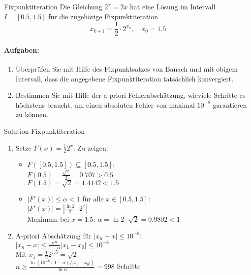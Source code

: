 \begin{example2}{Fixpunktiteration}
Die Gleichung $2^x = 2x$ hat eine Lösung im Intervall $I = [0.5, 1.5]$ für die zugehörige Fixpunktiteration
$$x_{k+1} = \frac{1}{2} \cdot 2^{x_k}, \quad x_0 = 1.5$$

\paragraph{Aufgaben:}
\begin{enumerate}
    \item Überprüfen Sie mit Hilfe des Fixpunktsatzes von Banach und mit obigem Intervall, dass die angegebene Fixpunktiteration tatsächlich konvergiert.
    
    \item Bestimmen Sie mit Hilfe der a priori Fehlerabschätzung, wieviele Schritte es höchstens braucht, um einen absoluten Fehler von maximal $10^{-8}$ garantieren zu können.
\end{enumerate}
\end{example2}

\begin{KR}{Solution Fixpunktiteration}
\begin{enumerate}
    \item Setze $F(x) = \frac{1}{2}2^x$. Zu zeigen:
    \begin{itemize}
        \item $F([0.5,1.5]) \subseteq [0.5,1.5]$:\\
        $F(0.5) = \frac{\sqrt{2}}{2} = 0.707 > 0.5$\\
        $F(1.5) = \sqrt{2} = 1.4142 < 1.5$ \checkmark
        
        \item $|F'(x)| \leq \alpha < 1$ für alle $x \in [0.5,1.5]$:\\
        $|F'(x)| = |\frac{\ln 2}{2} \cdot 2^x|$\\
        Maximum bei $x=1.5$: $\alpha = \ln 2 \cdot \sqrt{2} = 0.9802 < 1$ \checkmark
    \end{itemize}
    
    \item A-priori Abschätzung für $|x_n - x| \leq 10^{-8}$:\\
    $|x_n - x| \leq \frac{\alpha^n}{1-\alpha}|x_1-x_0| \leq 10^{-8}$\\
    Mit $x_1 = \frac{1}{2}2^{1.5} = \sqrt{2}$\\
    $n \geq \frac{\ln(10^{-8}(1-\alpha)/|x_1-x_0|)}{\ln \alpha} = 998$ Schritte
\end{enumerate}
\end{KR}

